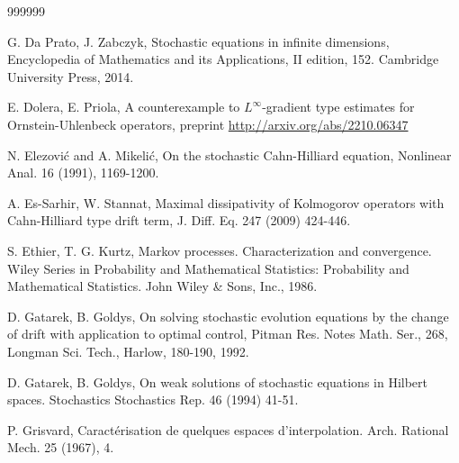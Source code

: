 \documentclass[preprint]{imsart}
\begin{document}
\begin{thebibliography}  {999999}
{ G. Da Prato, J. Zabczyk, Stochastic equations in 
 infinite
dimensions, Encyclopedia of Mathematics and its Applications, \! II edition, 152. Cambridge University Press,  2014. 
 


 E. Dolera, E. Priola, {A counterexample to $L^{\infty}$-gradient type estimates for Ornstein-Uhlenbeck operators,} 
    preprint   
    \url{http://arxiv.org/abs/2210.06347}

 N. Elezovi\'c and A. Mikeli\'c, On the stochastic Cahn-Hilliard equation, Nonlinear Anal. 16 (1991), 1169-1200.  
 
   A. Es-Sarhir,  W. Stannat, Maximal dissipativity of Kolmogorov operators with
Cahn-Hilliard type drift term, J. Diff. Eq. 247 (2009) 424-446. 
 
  S. Ethier, T. G. Kurtz, 
  Markov processes.
Characterization and convergence. Wiley Series in Probability and Mathematical Statistics: Probability and Mathematical Statistics. John Wiley \& Sons, Inc., 1986.



 D. Gatarek, B. Goldys,
 On solving stochastic evolution
equations by the change of drift with application to optimal
control, 
 Pitman Res. Notes
Math. Ser., 268, Longman Sci. Tech., Harlow, 180-190, 1992.
 


 D. Gatarek, B. Goldys,   On weak solutions of stochastic equations in Hilbert spaces. Stochastics Stochastics Rep. 46 (1994) 41-51.  
 
 
 {   \! \! P. Grisvard, Caract\'erisation de quelques espaces d'interpolation. Arch. Rational Mech. 25
(1967),  4.  } 
 
}
\end{thebibliography}
\end{document}
